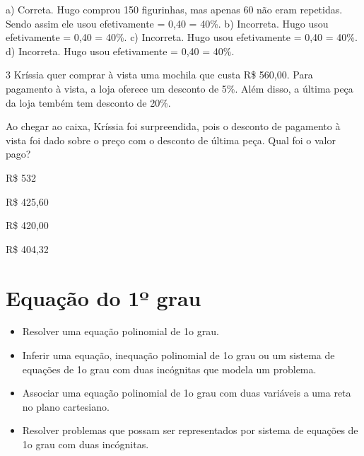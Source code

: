\begin{escolha}
{{{a) Correta. Hugo comprou 150 figurinhas, mas apenas 60 não eram repetidas.
Sendo assim ele usou efetivamente  = 0,40 = 40\%.
b) Incorreta. Hugo usou efetivamente  = 0,40 = 40\%.
c) Incorreta. Hugo usou efetivamente  = 0,40 = 40\%.
d) Incorreta. Hugo usou efetivamente  = 0,40 = 40\%.}

\num{3} Kríssia quer comprar à vista uma mochila que custa R\$ 560,00. 
Para pagamento à vista, a loja oferece um desconto de 5\%. Além disso, 
a última peça da loja tembém tem desconto de 20\%.

Ao chegar ao caixa, Kríssia foi surpreendida, pois o desconto de
pagamento à vista foi dado sobre o preço com o desconto de
última peça. Qual foi o valor pago?

\begin{escolha}

\item R\$ 532
\item R\$ 425,60
\item R\$ 420,00
\item R\$ 404,32

\end{escolha}


\pagestyle{mat}
\chapter{Equação do 1º grau}


\begin{itemize}

  \item Resolver uma equação polinomial de 1o grau.
  \item Inferir uma equação, inequação polinomial de 1o grau ou um sistema de
equações de 1o grau com duas incógnitas que modela um problema.
  \item Associar uma equação polinomial de 1o grau com duas variáveis a uma
reta no plano cartesiano.
  \item Resolver problemas que possam ser representados por sistema de
equações de 1o grau com duas incógnitas. 


\end{itemize}}}
\end{escolha}
